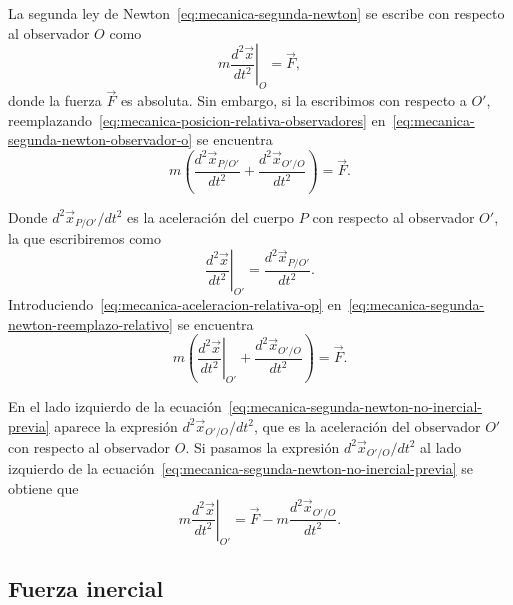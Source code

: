 \documentclass[../apunte_mecanica_clasica.tex]{subfiles}%
\begin{document}
La segunda ley de Newton~\eqref{eq:mecanica-segunda-newton} se escribe con respecto al observador $O$ como
\begin{equation}
    m\left.\frac{d^2\vec x}{dt^2}\right|_{O}=\vec F,
    \label{eq:mecanica-segunda-newton-observador-o}
\end{equation}
donde la fuerza $\vec F$ es absoluta. Sin embargo, si la escribimos con respecto a $O'$, reemplazando~\eqref{eq:mecanica-posicion-relativa-observadores} en~\eqref{eq:mecanica-segunda-newton-observador-o} se encuentra
\begin{equation}
    m\left(\frac{d^2\vec x_{P/O'}}{dt^2}+\frac{d^2\vec x_{O'/O}}{dt^2}\right)=\vec F.
    \label{eq:mecanica-segunda-newton-reemplazo-relativo}
\end{equation}

Donde $d^2\vec x_{P/O'}/dt^2$ es la aceleración del cuerpo $P$ con respecto al observador $O'$, la que escribiremos como
\begin{equation}
    \left.\frac{d^2\vec x}{dt^2}\right|_{O'}=\frac{d^2\vec x_{P/O'}}{dt^2}.
    \label{eq:mecanica-aceleracion-relativa-op}
\end{equation}
Introduciendo~\eqref{eq:mecanica-aceleracion-relativa-op} en~\eqref{eq:mecanica-segunda-newton-reemplazo-relativo} se encuentra
\begin{equation}
    m\left(\left.\frac{d^2\vec x}{dt^2}\right|_{O'}+\frac{d^2\vec x_{O'/O}}{dt^2}\right)=\vec F.
    \label{eq:mecanica-segunda-newton-no-inercial-previa}
\end{equation}

En el lado izquierdo de la ecuación~\eqref{eq:mecanica-segunda-newton-no-inercial-previa} aparece la expresión $d^2\vec x_{O'/O}/dt^2$, que es la aceleración del observador $O'$ con respecto al observador $O$. Si pasamos la expresión $d^2\vec x_{O'/O}/dt^2$ al lado izquierdo de la ecuación~\eqref{eq:mecanica-segunda-newton-no-inercial-previa} se obtiene que
\begin{equation}
    m\left.\frac{d^2\vec x}{dt^2}\right|_{O'}=\vec F-m\frac{d^2\vec x_{O'/O}}{dt^2}.
    \label{eq:mecanica-segunda-newton-no-inercial}
\end{equation}

\subsection{Fuerza inercial}
\end{document}
